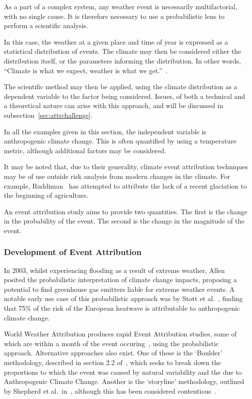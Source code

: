 As a part of a complex system,
    any weather event is necessarily multifactorial,
    with no single cause.
It is therefore necessary to use a probabilistic lens to perform a scientific analysis.

In this case, the weather at a given place and time of year is expressed as a statistical distribution of events.
The climate may then be considered either the distribution itself,
    or the parameters informing the distribution.
In other words, ``Climate is what we expect, weather is what we get.''~\cite{Herbertson_1935}.

The scientific method may then be applied,
    using the climate distribution as a dependent variable to the factor being considered.
Issues, of both a technical and a theoretical nature can arise with this approach,
    and will be discussed in subsection~\ref{sec:attrchallenge}.

In all the examples given in this section,
    the independent variable is anthropogenic climate change.
This is often quantified by using a temperature metric,
    although additional factors may be considered.

It may be noted that,
    due to their generality,
    climate event attribution techniques may be of use outside risk analysis from modern changes in the climate.
For example,
    Ruddiman~\cite{Ruddiman_2010} has attempted to attribute the lack of a recent glaciation to the beginning of agriculture.

An event attribution study aims to provide two quantities.
The first is the change in the probability of the event.
The second is the change in the magnitude of the event.

\subsubsection{Development of Event Attribution}

In 2003, whilst experiencing flooding as a result of extreme weather,
    Allen~\cite{Allen_2003} posited the probabilistic interpretation of climate change impacts,
    proposing a potential to find greenhouse gas emitters liable for extreme weather events.
A notable early use case of this probabilistic approach was by Stott et al.~\cite{Stott_2004},
    finding that 75\% of the risk of the European heatwave is attributable to anthropogenic climate change.

World Weather Attribution produces rapid Event Attribution studies,
    some of which are within a month of the event occuring~\cite{van_Oldenborgh_et_al_2018},
    using the probabilistic approach.
Alternative approaches also exist.
One of these is the `Boulder' methodology,
    described in section 2.2 of~\cite{Otto_2017},
    which seeks to break down the proportions to which the event was caused by natural variability and the due to Anthropogenic Climate Change.
Another is the `storyline' methodology,
    outlined by Shepherd et al.\ in~\cite{Shepherd_et_al_2018},
    although this has been considered contentious~\cite{García-Portela_Maraun_2023}.


